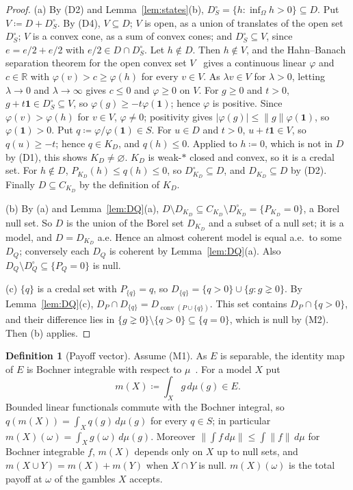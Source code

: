 \documentclass[11pt]{article}
\theoremstyle{definition}
\newtheorem{definition}[theorem]{Definition}
\newcommand{\R}{\mathbb R}
\newcommand{\one}{\mathbf 1}
\DeclareMathOperator{\conv}{conv}
\begin{document}
\begin{proof}
(a) By (D2) and Lemma~\ref{lem:states}(b), $D^\circ_S=\{h:\inf_\Omega h>0\}\subseteq D$. Put $V\coloneqq D+D^\circ_S$. By (D4), $V\subseteq D$; $V$ is open, as a union of translates of the open set $D^\circ_S$; $V$ is a convex cone, as a sum of convex cones; and $D^\circ_S\subseteq V$, since $e=e/2+e/2$ with $e/2\in D\cap D^\circ_S$. Let $h\notin D$. Then $h\notin V$, and the Hahn--Banach separation theorem for the open convex set $V$~\cite[Theorem~3.4]{Rudin} gives a continuous linear $\varphi$ and $c\in\R$ with $\varphi(v)>c\ge\varphi(h)$ for every $v\in V$. As $\lambda v\in V$ for $\lambda>0$, letting $\lambda\to0$ and $\lambda\to\infty$ gives $c\le0$ and $\varphi\ge0$ on $V$. For $g\ge0$ and $t>0$, $g+t\one\in D^\circ_S\subseteq V$, so $\varphi(g)\ge-t\varphi(\one)$; hence $\varphi$ is positive. Since $\varphi(v)>\varphi(h)$ for $v\in V$, $\varphi\ne0$; positivity gives $|\varphi(g)|\le\|g\|\varphi(\one)$, so $\varphi(\one)>0$. Put $q\coloneqq\varphi/\varphi(\one)\in S$. For $u\in D$ and $t>0$, $u+t\one\in V$, so $q(u)\ge-t$; hence $q\in K_D$, and $q(h)\le0$. Applied to $h\coloneqq0$, which is not in $D$ by (D1), this shows $K_D\ne\varnothing$. $K_D$ is weak-$\ast$ closed and convex, so it is a credal set. For $h\notin D$, $P_{K_D}(h)\le q(h)\le0$, so $D^\circ_{K_D}\subseteq D$, and $D_{K_D}\subseteq D$ by (D2). Finally $D\subseteq C_{K_D}$ by the definition of $K_D$.

(b) By (a) and Lemma~\ref{lem:DQ}(a), $D\setminus D_{K_D}\subseteq C_{K_D}\setminus D^\circ_{K_D}=\{P_{K_D}=0\}$, a Borel null set. So $D$ is the union of the Borel set $D_{K_D}$ and a subset of a null set; it is a model, and $D=D_{K_D}$ a.e. Hence an almost coherent model is equal a.e.\ to some $D_Q$; conversely each $D_Q$ is coherent by Lemma~\ref{lem:DQ}(a). Also $D_Q\setminus D^\circ_Q\subseteq\{P_Q=0\}$ is null.

(c) $\{q\}$ is a credal set with $P_{\{q\}}=q$, so $D_{\{q\}}=\{q>0\}\cup\{g:g\gneq0\}$. By Lemma~\ref{lem:DQ}(c), $D_P\cap D_{\{q\}}=D_{\conv(P\cup\{q\})}$. This set contains $D_P\cap\{q>0\}$, and their difference lies in $\{g\gneq0\}\setminus\{q>0\}\subseteq\{q=0\}$, which is null by (M2). Then (b) applies.
\end{proof}

\begin{definition}[Payoff vector]\label{def:payoff}
Assume (M1). As $E$ is separable, the identity map of $E$ is Bochner integrable with respect to $\mu$~\cite{DiestelUhl}. For a model $X$ put
\[
m(X)\coloneqq\int_Xg\,d\mu(g)\in E .
\]
Bounded linear functionals commute with the Bochner integral, so $q(m(X))=\int_Xq(g)\,d\mu(g)$ for every $q\in S$; in particular $m(X)(\omega)=\int_Xg(\omega)\,d\mu(g)$. Moreover $\|\int f\,d\mu\|\le\int\|f\|\,d\mu$ for Bochner integrable $f$, $m(X)$ depends only on $X$ up to null sets, and $m(X\cup Y)=m(X)+m(Y)$ when $X\cap Y$ is null. {\color{red}$m(X)(\omega)$ is the total payoff at $\omega$ of the gambles $X$ accepts.}
\end{definition}
\end{document}

